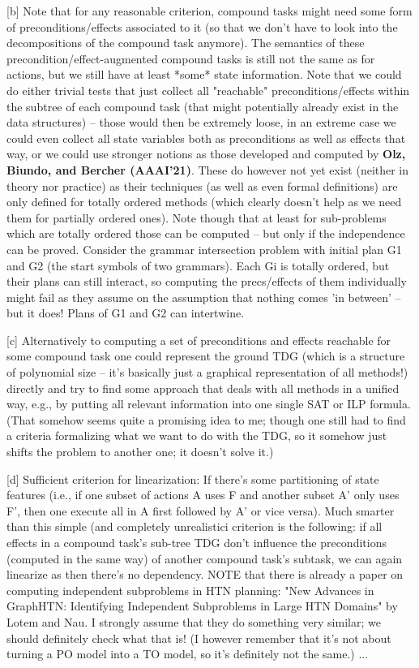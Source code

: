 [b] Note that for any reasonable criterion, compound tasks might need some form of preconditions/effects associated to it (so that we don't have to look into the decompositions of the compound task anymore). The semantics of these precondition/effect-augmented compound tasks is still not the same as for actions, but we still have at least *some* state information. Note that we could do either trivial tests that just collect all "reachable" preconditions/effects within the subtree of each compound task (that might potentially already exist in the data structures) -- those would then be extremely loose, in an extreme case we could even collect all state variables both as preconditions as well as effects that way, or we could use stronger notions as those developed and computed by \textbf{Olz, Biundo, and Bercher (AAAI'21)}. These do however not yet exist (neither in theory nor practice) as their techniques (as well as even formal definitions) are only defined for totally ordered methods (which clearly doesn't help as we need them for partially ordered ones). Note though that at least for sub-problems which are totally ordered those can be computed -- but only if the independence can be proved. Consider the grammar intersection problem with initial plan G1 and G2 (the start symbols of two grammars). Each Gi is totally ordered, but their plans can still interact, so computing the precs/effects of them individually might fail as they assume on the assumption that nothing comes 'in between' -- but it does! Plans of G1 and G2 can intertwine.


[c] Alternatively to computing a set of preconditions and effects reachable for some compound task one could represent the ground TDG (which is a structure of polynomial size -- it's basically just a graphical representation of all methods!) directly and try to find some approach that deals with all methods in a unified way, e.g., by putting all relevant information into one single SAT or ILP formula. (That somehow seems quite a promising idea to me; though one still had to find a criteria formalizing what we want to do with the TDG, so it somehow just shifts the problem to another one; it doesn't solve it.)

[d] Sufficient criterion for linearization: If there's some partitioning of state features (i.e., if one subset of actions A uses F and another subset A' only uses F', then one execute all in A first followed by A' or vice versa). Much smarter than this simple (and completely unrealistic^^) criterion is the following: if all effects in a compound task's sub-tree TDG don't influence the preconditions (computed in the same way) of another compound task's subtask, we can again linearize as then there's no dependency. NOTE that there is already a paper on computing independent subproblems in HTN planning: "New Advances in GraphHTN: Identifying Independent Subproblems in Large {HTN} Domains" by Lotem and Nau. I strongly assume that they do something very similar; we should definitely check what that is! (I however remember that it's not about turning a PO model into a TO model, so it's definitely not the same.)
...
